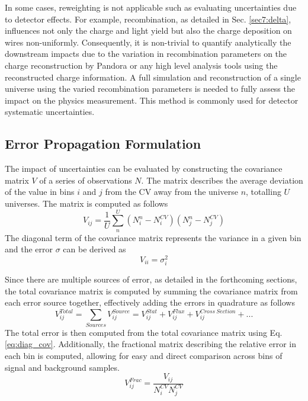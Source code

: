 In some cases, reweighting is not applicable such as evaluating uncertainties due to detector effects.
For example, recombination, as detailed in Sec. \ref{sec7:delta}, influences not only the charge and light yield but also the charge deposition on wires non-uniformly. 
Consequently, it is non-trivial to quantify analytically the downstream impacts due to the variation in recombination parameters on the charge reconstruction by Pandora or any high level analysis tools using the reconstructed charge information.
A full simulation and reconstruction of a single universe using the varied recombination parameters is needed to fully assess the impact on the physics measurement. 
This method is commonly used for detector systematic uncertainties.

\subsection{Error Propagation Formulation}
\label{sec:error_prop}

The impact of uncertainties can be evaluated by constructing the covariance matrix $V$ of a series of observations $N$.
The matrix describes the average deviation of the value in bins $i$ and $j$ from the CV away from the universe $n$, totalling $U$ universes.
The matrix is computed as follows
\begin{equation}
	V_{ij} = \frac{1}{U}\sum^{U}_{n} \left( N^n_{i} - N^{CV}_{i} \right) \left( N^n_{j} - N^{CV}_{j} \right)
\end{equation}
The diagonal term of the covariance matrix represents the variance in a given bin and the error $\sigma$ can be derived as
\begin{equation}
\label{eq:diag_cov}
	V_{ii} = \sigma^2_i
\end{equation}

Since there are multiple sources of error, as detailed in the forthcoming sections, the total covariance matrix is computed by summing the covariance matrix from each error source together, effectively adding the errors in quadrature as follows
\begin{equation}
	V^{Total}_{ij} = \sum_{Sources} V_{ij}^{Source} = V_{ij}^{Stat} + V_{ij}^{Flux} +V_{ij}^{Cross\ Section} + ...
\end{equation}
The total error is then computed from the total covariance matrix using Eq. \ref{eq:diag_cov}.
Additionally, the fractional matrix describing the relative error in each bin is computed, allowing for easy and direct comparison across bins of signal and background samples. 
\begin{equation}
	V_{ij}^{Frac} = \frac{V_{ij}}{N_i^{CV}N_j^{CV}}
\end{equation}

